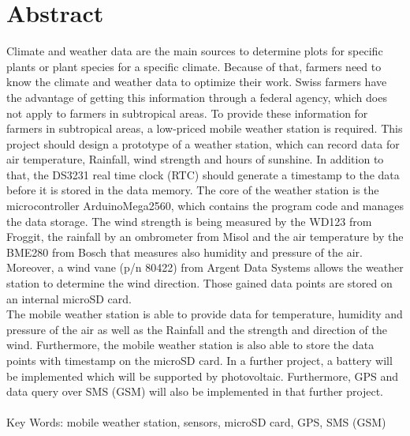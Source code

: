 \chapter*{Abstract}
\noindent
Climate and weather data are the main sources to determine plots for specific plants or plant species for a specific climate. Because of that, farmers need to know the climate and weather data to optimize their work. Swiss farmers have the advantage of getting this information through a federal agency, which does not apply to farmers in subtropical areas. To provide these information for farmers in subtropical areas, a low-priced mobile weather station is required. This project should design a prototype of a weather station, which can record data for air temperature, Rainfall, wind strength and hours of sunshine. In addition to that, the DS3231 real time clock (RTC) should generate a timestamp to the data before it is stored in the data memory. The core of the weather station is the microcontroller ArduinoMega2560, which contains the program code and manages the data storage. The wind strength is being measured by the WD123 from Froggit, the rainfall by an ombrometer from Misol and the air temperature by the BME280 from Bosch that measures also humidity and pressure of the air. Moreover, a wind vane (p/n 80422) from Argent Data Systems allows the weather station to determine the wind direction. Those gained data points are stored on an internal microSD card.\\[0.5cm]
The mobile weather station is able to provide data for temperature, humidity and pressure of the air as well as the Rainfall and the strength and direction of the wind. Furthermore, the mobile weather station is also able to store the data points with timestamp on the microSD card. In a further project, a battery will be implemented which will be supported by photovoltaic. Furthermore, GPS and data query over SMS (GSM) will also be implemented in that further project.\\
\\
Key Words: mobile weather station, sensors, microSD card, GPS, SMS (GSM)


